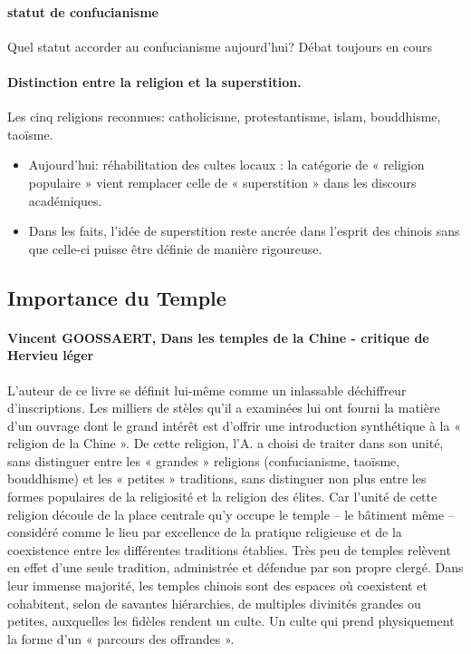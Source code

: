 \paragraph{statut de confucianisme} Quel statut accorder au confucianisme aujourd’hui? Débat toujours en cours
\paragraph{Distinction entre la religion et la superstition.}
Les cinq religions reconnues: catholicisme, protestantisme, islam, bouddhisme, taoïsme.

\begin{itemize}
    \item  	Aujourd’hui: réhabilitation des cultes locaux : la catégorie de
« religion populaire » vient remplacer celle de « superstition » dans les discours académiques.
   \item 	Dans les faits, l’idée de superstition reste ancrée dans l’esprit des chinois sans que celle-ci puisse être définie de manière rigoureuse.
\end{itemize}

\subsection{Importance du Temple}

\paragraph{Vincent GOOSSAERT, Dans les temples de la Chine - critique de Hervieu léger}

L’auteur de ce livre se définit lui-même comme un inlassable déchiffreur d’inscriptions. Les milliers de stèles qu’il a examinées lui ont fourni la matière d’un ouvrage dont le grand intérêt est d’offrir une introduction synthétique à la « religion de la Chine ». De cette religion, l’A. a choisi de traiter dans son unité, sans distinguer entre les « grandes » religions (confucianisme, taoïsme, bouddhisme) et les « petites » traditions, sans distinguer non plus entre les formes populaires de la religiosité et la religion des élites. Car l’unité de cette religion découle de la place centrale qu’y occupe le temple – le bâtiment même – considéré comme le lieu par excellence de la pratique religieuse et de la coexistence entre les différentes traditions établies. Très peu de temples relèvent en effet d’une seule tradition, administrée et défendue par son propre clergé. Dans leur immense majorité, les temples chinois sont des espaces où coexistent et cohabitent, selon de savantes hiérarchies, de multiples divinités grandes ou petites, auxquelles les fidèles rendent un culte. Un culte qui prend physiquement la forme d’un « parcours des offrandes ».

